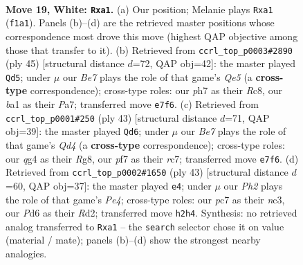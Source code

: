 \documentclass[11pt]{article}
\begin{document}
\clearpage

\begin{figure}[p]\centering
\begin{subfigure}{0.46\textwidth}\centering
\resizebox{\linewidth}{!}{%
\newchessgame
\chessboard[
  setfen={rn2r1k1/p1p1Bp1p/3P2p1/8/2Q1P1q1/8/P4P1P/b4R1K w - - 0 19},
  showmover=false,
  pgfstyle=straightmove, color=movearrow, markmove={f1-a1}
]}
\caption{}
\end{subfigure}\hfill
\begin{subfigure}{0.46\textwidth}\centering
\resizebox{\linewidth}{!}{%
\newchessgame
\chessboard[
  setfen={2r3k1/pp3rb1/3p2pp/8/PP1pq3/R6P/1B3PP1/3QR1K1 b - - 3 23},
  showmover=false,
  pgfstyle=straightmove, color=movearrow, markmove={e4-d5}
]}
\caption{}
\end{subfigure}
\\[4pt]
\begin{subfigure}{0.46\textwidth}\centering
\resizebox{\linewidth}{!}{%
\newchessgame
\chessboard[
  setfen={r3k1r1/2R1bp2/p3p3/3q2P1/3P2Q1/1pN5/PP3P2/4K1R1 b q - 1 22},
  showmover=false,
  pgfstyle=straightmove, color=movearrow, markmove={d5-d6}
]}
\caption{}
\end{subfigure}\hfill
\begin{subfigure}{0.46\textwidth}\centering
\resizebox{\linewidth}{!}{%
\newchessgame
\chessboard[
  setfen={7r/5p1p/1Qpk3b/4p3/8/2N2q2/PPPr1P1P/R4KR1 b - - 8 22},
  showmover=false,
  pgfstyle=straightmove, color=movearrow, markmove={e5-e4}
]}
\caption{}
\end{subfigure}
\caption{\textbf{Move 19, White: \texttt{Rxa1}.} (a) Our position; Melanie plays \texttt{Rxa1} (\texttt{f1a1}). Panels (b)--(d) are the retrieved master positions whose correspondence most drove this move (highest QAP objective among those that transfer to it). (b) Retrieved from \texttt{ccrl\_top\_p0003\#2890} (ply 45) [structural distance $d$=72, QAP obj=42]: the master played \texttt{Qd5}; under $\mu$ our \emph{Be7} plays the role of that game's \emph{Qe5} (a \textbf{cross-type} correspondence); cross-type roles: our \emph{p}h7 as their \emph{R}c8, our \emph{b}a1 as their \emph{P}a7; transferred move \texttt{e7f6}. (c) Retrieved from \texttt{ccrl\_top\_p0001\#250} (ply 43) [structural distance $d$=71, QAP obj=39]: the master played \texttt{Qd6}; under $\mu$ our \emph{Be7} plays the role of that game's \emph{Qd4} (a \textbf{cross-type} correspondence); cross-type roles: our \emph{q}g4 as their \emph{R}g8, our \emph{p}f7 as their \emph{r}c7; transferred move \texttt{e7f6}. (d) Retrieved from \texttt{ccrl\_top\_p0002\#1650} (ply 43) [structural distance $d$=60, QAP obj=37]: the master played \texttt{e4}; under $\mu$ our \emph{Ph2} plays the role of that game's \emph{Pe4}; cross-type roles: our \emph{p}c7 as their \emph{n}c3, our \emph{P}d6 as their \emph{R}d2; transferred move \texttt{h2h4}. Synthesis: no retrieved analog transferred to \texttt{Rxa1} -- the \texttt{search} selector chose it on value (material / mate); panels (b)--(d) show the strongest nearby analogies.}
\label{fig:thought-m36}
\end{figure}
\end{document}
